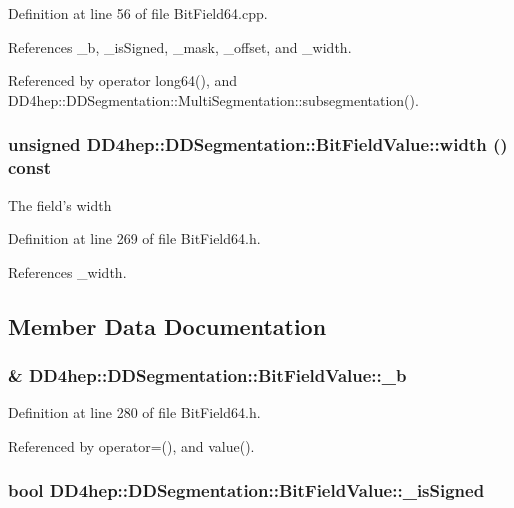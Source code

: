 Definition at line 56 of file BitField64.cpp.

References \_\-b, \_\-isSigned, \_\-mask, \_\-offset, and \_\-width.

Referenced by operator long64(), and DD4hep::DDSegmentation::MultiSegmentation::subsegmentation().\hypertarget{class_d_d4hep_1_1_d_d_segmentation_1_1_bit_field_value_a25b81e6bb05d7e62bd39e5dcf14a1ad4}{
\subsubsection[{width}]{\setlength{\rightskip}{0pt plus 5cm}unsigned DD4hep::DDSegmentation::BitFieldValue::width () const}}
\label{class_d_d4hep_1_1_d_d_segmentation_1_1_bit_field_value_a25b81e6bb05d7e62bd39e5dcf14a1ad4}
The field's width 

Definition at line 269 of file BitField64.h.

References \_\-width.

\subsection{Member Data Documentation}
\hypertarget{class_d_d4hep_1_1_d_d_segmentation_1_1_bit_field_value_a0105c82bf79092f583b6c88f2e34267a}{
\subsubsection[{\_\-b}]{\& {\bf DD4hep::DDSegmentation::BitFieldValue::\_\-b}}}
\label{class_d_d4hep_1_1_d_d_segmentation_1_1_bit_field_value_a0105c82bf79092f583b6c88f2e34267a}


Definition at line 280 of file BitField64.h.

Referenced by operator=(), and value().\hypertarget{class_d_d4hep_1_1_d_d_segmentation_1_1_bit_field_value_a22e42eb6cbef6b643840f09dccac5f42}{
\subsubsection[{\_\-isSigned}]{\setlength{\rightskip}{0pt plus 5cm}bool {\bf DD4hep::DDSegmentation::BitFieldValue::\_\-isSigned}}}
\label{class_d_d4hep_1_1_d_d_segmentation_1_1_bit_field_value_a22e42eb6cbef6b643840f09dccac5f42}


